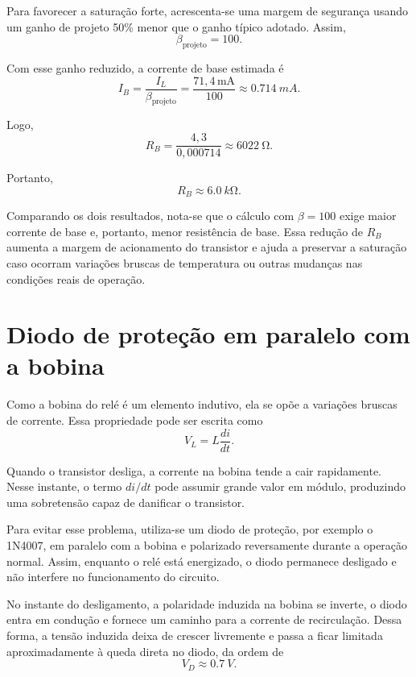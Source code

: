 \documentclass[12pt,a4paper]{article}
\newcommand{\Ib}{I_B}
\newcommand{\Il}{I_L}
\newcommand{\Rb}{R_B}
\begin{document}
Para favorecer a saturação forte, acrescenta-se uma margem de segurança usando um ganho de projeto 50\% menor que o ganho típico adotado. Assim,
\begin{equation}
\beta_{\text{projeto}} = 100.
\end{equation}

Com esse ganho reduzido, a corrente de base estimada é
\begin{equation}
\Ib = \frac{\Il}{\beta_{\text{projeto}}}
= \frac{71,4\,\mathrm{mA}}{100}
\approx \SI{0,714}{mA}.
\end{equation}

Logo,
\begin{equation}
\Rb = \frac{4,3}{0,000714}
\approx \SI{6022}{\ohm}.
\end{equation}

Portanto,
\begin{equation}
\boxed{\Rb \approx \SI{6,0}{k\ohm}}.
\end{equation}

Comparando os dois resultados, nota-se que o cálculo com $\beta = 100$ exige maior corrente de base e, portanto, menor resistência de base. Essa redução de $\Rb$ aumenta a margem de acionamento do transistor e ajuda a preservar a saturação caso ocorram variações bruscas de temperatura ou outras mudanças nas condições reais de operação.

\section{Diodo de proteção em paralelo com a bobina}

Como a bobina do relé é um elemento indutivo, ela se opõe a variações bruscas de corrente. Essa propriedade pode ser escrita como
\begin{equation}
V_L = L\frac{di}{dt}.
\end{equation}

Quando o transistor desliga, a corrente na bobina tende a cair rapidamente. Nesse instante, o termo $di/dt$ pode assumir grande valor em módulo, produzindo uma sobretensão capaz de danificar o transistor.

Para evitar esse problema, utiliza-se um diodo de proteção, por exemplo o 1N4007, em paralelo com a bobina e polarizado reversamente durante a operação normal. Assim, enquanto o relé está energizado, o diodo permanece desligado e não interfere no funcionamento do circuito.

No instante do desligamento, a polaridade induzida na bobina se inverte, o diodo entra em condução e fornece um caminho para a corrente de recirculação. Dessa forma, a tensão induzida deixa de crescer livremente e passa a ficar limitada aproximadamente à queda direta no diodo, da ordem de
\begin{equation}
V_D \approx \SI{0,7}{V}.
\end{equation}
\end{document}
